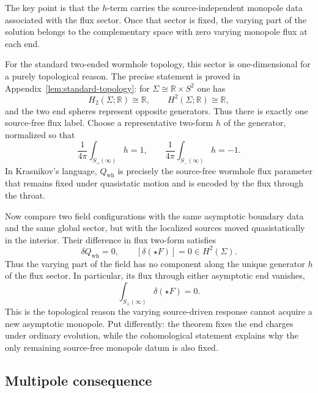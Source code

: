 \documentclass[aps,prd,onecolumn,nofootinbib,superscriptaddress]{revtex4-2}
\begin{document}
The key point is that the $h$-term carries the source-independent monopole data associated with the flux sector. Once that sector is fixed, the varying part of the solution belongs to the complementary space with zero varying monopole flux at each end.

For the standard two-ended wormhole topology, this sector is one-dimensional for a purely topological reason. The precise statement is proved in Appendix~\ref{lem:standard-topology}: for $\Sigma\cong \mathbb{R}\times S^2$ one has
\begin{equation}
H_2(\Sigma;\mathbb{R})\cong \mathbb{R},
\qquad
H^2(\Sigma;\mathbb{R})\cong \mathbb{R},
\end{equation}
and the two end spheres represent opposite generators. Thus there is exactly one source-free flux label. Choose a representative two-form $h$ of the generator, normalized so that
\begin{equation}
\frac{1}{4\pi}\int_{S_{+}(\infty)} h = 1,
\qquad
\frac{1}{4\pi}\int_{S_{-}(\infty)} h = -1.
\end{equation}
In Krasnikov's language, $Q_{\mathrm{wh}}$ is precisely the source-free wormhole flux parameter that remains fixed under quasistatic motion and is encoded by the flux through the throat.\cite{Krasnikov2008ElectrostaticInteraction}

Now compare two field configurations with the same asymptotic boundary data and the same global sector, but with the localized sources moved quasistatically in the interior. Their difference in flux two-form satisfies
\begin{equation}
\delta Q_{\mathrm{wh}} = 0,
\qquad
[\delta(\star F)] = 0 \in H^2(\Sigma).
\end{equation}
Thus the varying part of the field has no component along the unique generator $h$ of the flux sector. In particular, its flux through either asymptotic end vanishes,
\begin{equation}
\int_{S_{\pm}(\infty)} \delta(\star F)=0.
\end{equation}
This is the topological reason the varying source-driven response cannot acquire a new asymptotic monopole. Put differently: the theorem fixes the end charges under ordinary evolution, while the cohomological statement explains why the only remaining source-free monopole datum is also fixed.

\subsection{Multipole consequence}
\end{document}
